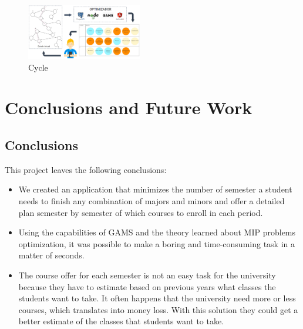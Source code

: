 \documentclass[journal]{IEEEtran}
\begin{document}
\begin{figure}[h!]
    \centering
    \includegraphics[width=0.45\textwidth]{img/cycle}
    \caption{Cycle}
    \label{cycle}
\end{figure}


\section{Conclusions and Future Work }

\subsection{Conclusions}

This project leaves the following conclusions:\\

\begin{itemize}
    \item We created an application that minimizes the number of semester a student needs to finish any combination of majors and minors and offer a detailed plan semester by semester of which courses to enroll in each period. \\
    \item Using the capabilities of GAMS and the theory learned about MIP problems optimization, it was possible to make a boring and time-consuming task in a matter of seconds.\\
    \item The course offer for each semester is not an easy task for the university because they have to estimate based on previous years what classes the students want to take. It often happens that the university need more or less courses, which translates into money loss. With this solution they could get a better estimate of the classes that students want to take. \\
\end{itemize}
\end{document}
